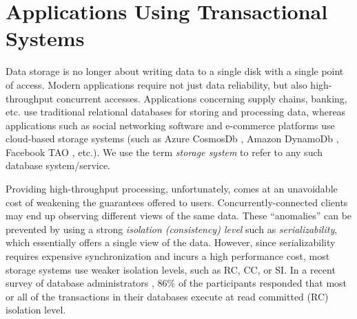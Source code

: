 \section{Applications Using Transactional Systems}
\label{sec:app:intro}

Data storage is no longer about writing data to a single
disk with a single point of access. Modern applications require not just data
reliability, but also high-throughput concurrent accesses. 
Applications concerning supply chains, banking, etc. use traditional relational databases
for storing and processing data, whereas applications such as social networking
software and e-commerce platforms 
use cloud-based storage systems (such as Azure CosmosDb \cite{cosmosdb}, Amazon DynamoDb
\cite{DBLP:conf/sosp/DeCandiaHJKLPSVV07}, Facebook TAO \cite{DBLP:conf/usenix/BronsonACCDDFGKLMPPSV13}, etc.). We use the term \textit{storage
system} to refer to any such database system/service.

Providing high-throughput processing, unfortunately, comes at an unavoidable cost of weakening 
the guarantees offered to users.
Concurrently-connected clients may end up observing different views of the same data. 
These ``anomalies'' can be prevented by using a strong \textit{isolation (consistency) level}  
such as \textit{serializability}, which essentially offers a single view of the
data. However, since serializability requires expensive synchronization and incurs a high performance cost, 
most storage systems use weaker isolation levels, such as RC, CC, or SI. 
In a recent survey of
database administrators \cite{DBLP:conf/sigmod/Pavlo17}, 86\% of the participants responded that
most or all of the transactions in their databases execute at read committed (RC) isolation level.

